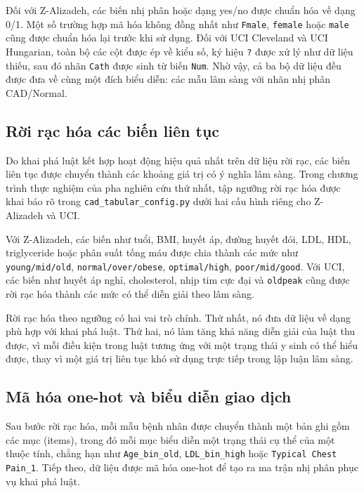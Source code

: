 \blocksep

Đối với Z-Alizadeh, các biến nhị phân hoặc dạng yes/no được chuẩn hóa về dạng 0/1. Một số trường hợp mã hóa không đồng nhất như \texttt{Fmale}, \texttt{female} hoặc \texttt{male} cũng được chuẩn hóa lại trước khi sử dụng. Đối với UCI Cleveland và UCI Hungarian, toàn bộ các cột được ép về kiểu số, ký hiệu \texttt{?} được xử lý như dữ liệu thiếu, sau đó nhãn \texttt{Cath} được sinh từ biến \texttt{Num}. Nhờ vậy, cả ba bộ dữ liệu đều được đưa về cùng một đích biểu diễn: các mẫu lâm sàng với nhãn nhị phân CAD/Normal.

\blocksep

\subsection{Rời rạc hóa các biến liên tục}

\blocksep

Do khai phá luật kết hợp hoạt động hiệu quả nhất trên dữ liệu rời rạc, các biến liên tục được chuyển thành các khoảng giá trị có ý nghĩa lâm sàng. Trong chương trình thực nghiệm của pha nghiên cứu thứ nhất, tập ngưỡng rời rạc hóa được khai báo rõ trong \texttt{cad\_tabular\_config.py} dưới hai cấu hình riêng cho Z-Alizadeh và UCI.

\blocksep

Với Z-Alizadeh, các biến như tuổi, BMI, huyết áp, đường huyết đói, LDL, HDL, triglyceride hoặc phân suất tống máu được chia thành các mức như \texttt{young/mid/old}, \texttt{normal/over/obese}, \texttt{optimal/high}, \texttt{poor/mid/good}. Với UCI, các biến như huyết áp nghỉ, cholesterol, nhịp tim cực đại và \texttt{oldpeak} cũng được rời rạc hóa thành các mức có thể diễn giải theo lâm sàng.

\blocksep

Rời rạc hóa theo ngưỡng có hai vai trò chính. Thứ nhất, nó đưa dữ liệu về dạng phù hợp với khai phá luật. Thứ hai, nó làm tăng khả năng diễn giải của luật thu được, vì mỗi điều kiện trong luật tương ứng với một trạng thái y sinh có thể hiểu được, thay vì một giá trị liên tục khó sử dụng trực tiếp trong lập luận lâm sàng.

\blocksep

\subsection{Mã hóa one-hot và biểu diễn giao dịch}

\blocksep

Sau bước rời rạc hóa, mỗi mẫu bệnh nhân được chuyển thành một bản ghi gồm các mục (items), trong đó mỗi mục biểu diễn một trạng thái cụ thể của một thuộc tính, chẳng hạn như \texttt{Age\_bin\_old}, \texttt{LDL\_bin\_high} hoặc \texttt{Typical Chest Pain\_1}. Tiếp theo, dữ liệu được mã hóa one-hot để tạo ra ma trận nhị phân phục vụ khai phá luật.

